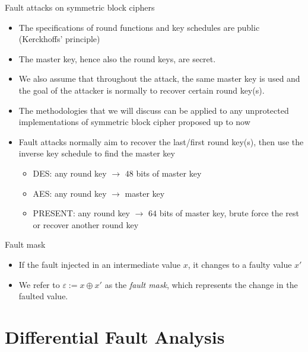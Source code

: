 \begin{frame}{Fault attacks on symmetric block ciphers}
    \begin{itemize}
        \item The specifications of round functions and key schedules are public (Kerckhoffs' principle)
       \item The master key, hence also the round keys, are secret.
        \item We also assume that throughout the attack, the same master key is used and the goal of the attacker is normally to recover certain round key(s).
         \item The methodologies that we will discuss can be applied to any unprotected implementations of symmetric block cipher proposed up to now
         \item Fault attacks normally aim to recover the last/first round key(s), then use the inverse key schedule to find the master key
        \begin{itemize}
            \item DES: any round key $\to$ $48$ bits of master key
            \item AES: any round key $\to$ master key
            \item PRESENT: any round key $\to$ $64$ bits of master key, brute force the rest or recover another round key
        \end{itemize}
    \end{itemize}
\end{frame}

\begin{frame}{Fault mask}
    \begin{itemize}
        \item If the fault injected in an intermediate value $x$, it changes to a faulty value $x'$
        \item We refer to $\varepsilon:=x\oplus x'$ as the \textit{fault mask}, which represents the change in the faulted value.
    \end{itemize}
\end{frame}

\section{Differential Fault Analysis}
\begin{frame}{\VideoName}
    \tableofcontents[currentsection]
\end{frame}

